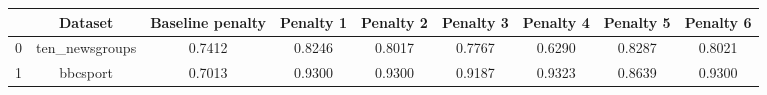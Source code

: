 \begin{tabular}{|l|c|c|c|c|c|c|c|c|}
\hline
 & Dataset & Baseline penalty & Penalty 1 & Penalty 2 & Penalty 3 & Penalty 4 & Penalty 5 & Penalty 6 \\
\hline
0 & ten_newsgroups & 0.7412 & 0.8246 & 0.8017 & 0.7767 & 0.6290 & 0.8287 & 0.8021 \\
1 & bbcsport & 0.7013 & 0.9300 & 0.9300 & 0.9187 & 0.9323 & 0.8639 & 0.9300 \\
\hline
\end{tabular}
